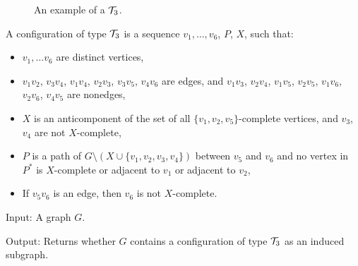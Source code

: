 \begin{wrapfigure}{r}{0.35\textwidth}
	\vspace{-1cm}
	
	\caption{An example of a $\mathcal{T}_3$.}%
	\vspace{-2cm}
\end{wrapfigure}

A configuration of type $\mathcal{T}_3$ is a sequence $v_1, \ldots, v_6$, $P$, $X$, such that:
\begin{itemize}
	\item $v_1, \ldots v_6$ are distinct vertices,
	\item $v_1v_2$, $v_3v_4$, $v_1v_4$, $v_2v_3$, $v_3v_5$, $v_4v_6$ are edges, and $v_1v_3$, $v_2v_4$, $v_1v_5$, $v_2v_5$, $v_1v_6$, $v_2v_6$, $v_4v_5$ are nonedges,
	\item $X$ is an anticomponent of the set of all $\{v_1, v_2, v_5\}$-complete vertices, and $v_3$, $v_4$ are not $X$-complete,
	\item $P$ is a path of $G \setminus ( X \cup \{v_1, v_2, v_3, v_4\} )$ between $v_5$ and $v_6$ and no vertex in $P^*$ is $X$-complete or adjacent to $v_1$ or adjacent to $v_2$,
	\item If $v_5v_6$ is an edge, then $v_6$ is not $X$-complete.
\end{itemize}


\begin{alg}
	\label{alg:t3}
	Input: A graph $G$.

	\noindent Output: Returns whether $G$ contains a configuration of type $\mathcal{T}_3$ as an induced subgraph.
\end{alg}


